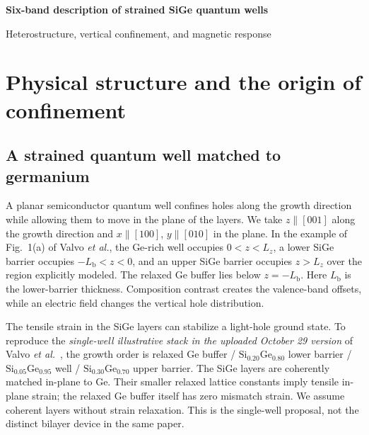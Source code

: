 \thispagestyle{empty}
\begin{center}
{\large\bfseries Six-band description of strained SiGe quantum wells}\par
\vspace{11pt}
Heterostructure, vertical confinement, and magnetic response
\end{center}
\vspace{20pt}
\hypersetup{linkcolor=black}
\tableofcontents
\hypersetup{linkcolor=blue}
\vspace{23pt}
\clearpage

\section{Physical structure and the origin of confinement}
\label{sec:device}

\subsection{A strained quantum well matched to germanium}

A planar semiconductor quantum well confines holes along the growth direction while allowing them to move in the plane of the layers. We take $z\parallel[001]$ along the growth direction and $x\parallel[100]$, $y\parallel[010]$ in the plane. In the example of Fig.~1(a) of Valvo \emph{et al.}, the Ge-rich well occupies $0<z<L_z$, a lower SiGe barrier occupies $-L_{\mathrm b}<z<0$, and an upper SiGe barrier occupies $z>L_z$ over the region explicitly modeled. The relaxed Ge buffer lies below $z=-L_{\mathrm b}$. Here $L_{\mathrm b}$ is the lower-barrier thickness. Composition contrast creates the valence-band offsets, while an electric field changes the vertical hole distribution.

The tensile strain in the SiGe layers can stabilize a light-hole ground state. To reproduce the \emph{single-well illustrative stack in the uploaded October 29 version} of Valvo \emph{et al.}~\cite{valvo}, the growth order is relaxed Ge buffer / $\mathrm{Si}_{0.20}\mathrm{Ge}_{0.80}$ lower barrier / $\mathrm{Si}_{0.05}\mathrm{Ge}_{0.95}$ well / $\mathrm{Si}_{0.30}\mathrm{Ge}_{0.70}$ upper barrier. The SiGe layers are coherently matched in-plane to Ge. Their smaller relaxed lattice constants imply tensile in-plane strain; the relaxed Ge buffer itself has zero mismatch strain. We assume coherent layers without strain relaxation. This is the single-well proposal, not the distinct bilayer device in the same paper.

